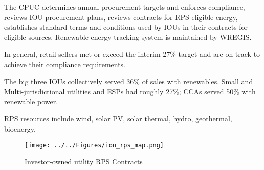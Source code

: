 \documentclass[11pt, oneside]{article}   	%
\begin{document}
The CPUC determines annual procurement targets and enforces compliance, reviews IOU procurement plans, reviews contracts for RPS-eligible energy, establishes standard terms and conditions used by IOUs in their contracts for eligible sources.  Renewable energy tracking system is maintained by WREGIS.  

In general, retail sellers met or exceed the interim 27\% target and are on track to achieve their compliance requirements. 

The big three IOUs collectively served 36\% of sales with renewables.  Small and Multi-jurisdictional utilities and ESPs had roughly 27\%; CCAs served 50\% with renewable power.  

RPS resources include wind, solar PV, solar thermal, hydro, geothermal, bioenergy.  
\begin{figure}
\caption{Investor-owned utility RPS Contracts}
\texttt{[image: ../../Figures/iou\_rps\_map.png]}
\end{figure}
\end{document}
